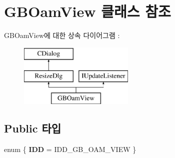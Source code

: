 \hypertarget{class_g_b_oam_view}{}\section{G\+B\+Oam\+View 클래스 참조}
\label{class_g_b_oam_view}
G\+B\+Oam\+View에 대한 상속 다이어그램 \+: \begin{figure}[H]
\begin{center}
\leavevmode
\includegraphics[height=3.000000cm]{class_g_b_oam_view}
\end{center}
\end{figure}
\subsection*{Public 타입}
\begin{DoxyCompactItemize}
\item 
\mbox{\label{class_g_b_oam_view_a5c41d4094ee7a3c5fc13c3e57414e350}} 
enum \{ {\bfseries I\+DD} = I\+D\+D\+\_\+\+G\+B\+\_\+\+O\+A\+M\+\_\+\+V\+I\+EW
 \}
\end{DoxyCompactItemize}
